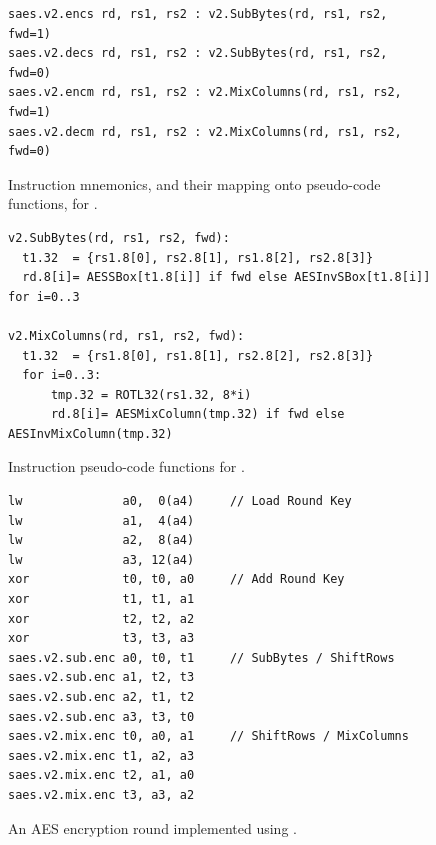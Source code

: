 
\vspace*{\fill}

\begin{figure}[!h]
\begin{lstlisting}[language=pseudo,style=block]
saes.v2.encs rd, rs1, rs2 : v2.SubBytes(rd, rs1, rs2, fwd=1)
saes.v2.decs rd, rs1, rs2 : v2.SubBytes(rd, rs1, rs2, fwd=0)
saes.v2.encm rd, rs1, rs2 : v2.MixColumns(rd, rs1, rs2, fwd=1)
saes.v2.decm rd, rs1, rs2 : v2.MixColumns(rd, rs1, rs2, fwd=0)
\end{lstlisting}
\caption{
  Instruction mnemonics, and their mapping onto pseudo-code functions, for .
}
\label{fig:v2:mnemonics}
\end{figure}

\begin{figure}[!h]
\begin{lstlisting}[language=pseudo,style=block]
v2.SubBytes(rd, rs1, rs2, fwd):
  t1.32  = {rs1.8[0], rs2.8[1], rs1.8[2], rs2.8[3]}
  rd.8[i]= AESSBox[t1.8[i]] if fwd else AESInvSBox[t1.8[i]] for i=0..3

v2.MixColumns(rd, rs1, rs2, fwd):
  t1.32  = {rs1.8[0], rs1.8[1], rs2.8[2], rs2.8[3]}
  for i=0..3:
      tmp.32 = ROTL32(rs1.32, 8*i)
      rd.8[i]= AESMixColumn(tmp.32) if fwd else AESInvMixColumn(tmp.32)
\end{lstlisting}
\caption{
  Instruction pseudo-code functions for .
}
\label{fig:v2:pseudo}
\end{figure}

\begin{figure}[!h]
\begin{lstlisting}[language=pseudo,style=block]
lw              a0,  0(a4)     // Load Round Key
lw              a1,  4(a4)
lw              a2,  8(a4)
lw              a3, 12(a4)
xor             t0, t0, a0     // Add Round Key
xor             t1, t1, a1
xor             t2, t2, a2
xor             t3, t3, a3
saes.v2.sub.enc a0, t0, t1     // SubBytes / ShiftRows
saes.v2.sub.enc a1, t2, t3
saes.v2.sub.enc a2, t1, t2
saes.v2.sub.enc a3, t3, t0
saes.v2.mix.enc t0, a0, a1     // ShiftRows / MixColumns
saes.v2.mix.enc t1, a2, a3
saes.v2.mix.enc t2, a1, a0
saes.v2.mix.enc t3, a3, a2
\end{lstlisting}
\caption{
  An AES encryption round implemented using .
}
\label{fig:v2:round}
\end{figure}

\vspace*{\fill}

